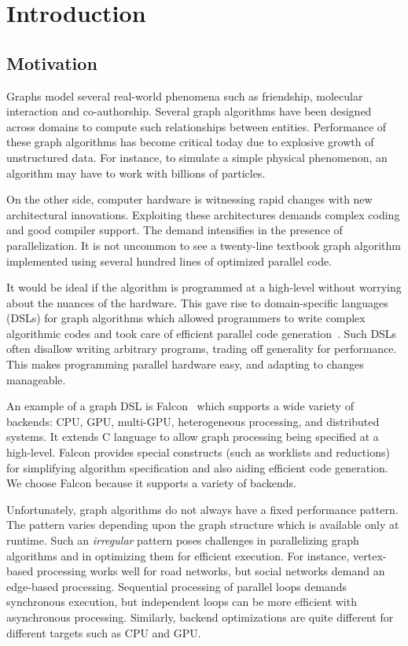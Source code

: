 \section{Introduction}\label{sec:introduction}
\subsection{Motivation}
Graphs model several real-world phenomena such as friendship, molecular interaction and co-authorship.
Several graph algorithms have been designed across domains to compute such relationships between entities.
Performance of these graph algorithms has become critical today due to explosive growth of unstructured data.
For instance, to simulate a simple physical phenomenon, an algorithm may have to work with billions of particles.

On the other side, computer hardware is witnessing rapid changes with new architectural innovations.
Exploiting these architectures demands complex coding and good compiler support.
The demand intensifies in the presence of parallelization.
It is not uncommon to see a twenty-line textbook graph algorithm implemented using several hundred lines of optimized parallel code.

It would be ideal if the algorithm is programmed at a high-level without worrying about the nuances of the hardware.
This gave rise to domain-specific languages (DSLs) for graph algorithms which allowed programmers to write complex algorithmic codes and took care of efficient parallel code generation~\cite{greenmarl, lighthouse, falcon}.
Such DSLs often disallow writing arbitrary programs, trading off generality for performance.
This makes programming parallel hardware easy, and adapting to changes manageable.

An example of a graph DSL is Falcon~\cite{falcon, dhfalcon} which supports a wide variety of backends: CPU, GPU, multi-GPU, heterogeneous processing, and distributed systems. 
It extends C language to allow graph processing being specified at a high-level.
Falcon provides special constructs (such as worklists and reductions) for simplifying algorithm specification and also aiding efficient code generation.
We choose Falcon because it supports a variety of backends.

Unfortunately, graph algorithms do not always have a fixed performance pattern.
The pattern varies depending upon the graph structure which is available only at runtime.
Such an \textit{irregular} pattern poses challenges in parallelizing graph algorithms and in optimizing them for efficient execution.
For instance, vertex-based processing works well for road networks, but social networks demand an edge-based processing.
Sequential processing of parallel loops demands synchronous execution, but independent loops can be more efficient with asynchronous processing.
Similarly, backend optimizations are quite different for different targets such as CPU and GPU.

